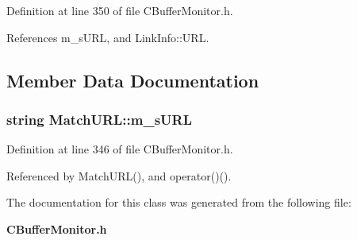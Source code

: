 Definition at line 350 of file CBuffer\-Monitor.h.

References m\_\-s\-URL, and Link\-Info::URL.

\subsection{Member Data Documentation}
\subsubsection{\setlength{\rightskip}{0pt plus 5cm}string Match\-URL::m\_\-s\-URL\hspace{0.3cm}{\tt  [private]}}\label{classMatchURL_o0}




Definition at line 346 of file CBuffer\-Monitor.h.

Referenced by Match\-URL(), and operator()().

The documentation for this class was generated from the following file:\begin{CompactItemize}
\item 
{\bf CBuffer\-Monitor.h}\end{CompactItemize}
